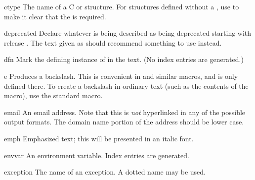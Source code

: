 \documentclass{howto}
\begin{document}
    \begin{macrodesc}{ctype}{}
      The name of a C  or structure.  For structures
      defined without a , use  to make it clear that the  is
      required.
    \end{macrodesc}

    \begin{macrodesc}{deprecated}{}
      Declare whatever is being described as being deprecated starting 
      with release .  The text given as 
      should recommend something to use instead.
    \end{macrodesc}

    \begin{macrodesc}{dfn}{}
      Mark the defining instance of  in the text.  (No index 
      entries are generated.)
    \end{macrodesc}

    \begin{macrodesc}{e}{}
      Produces a backslash.  This is convenient in  and
      similar macros, and is only defined there.  To create a
      backslash in ordinary text (such as the contents of the
       macro), use the standard  macro.
    \end{macrodesc}

    \begin{macrodesc}{email}{}
      An email address.  Note that this is \emph{not} hyperlinked in
      any of the possible output formats.  The domain name portion of
      the address should be lower case.
    \end{macrodesc}

    \begin{macrodesc}{emph}{}
      Emphasized text; this will be presented in an italic font.
    \end{macrodesc}

    \begin{macrodesc}{envvar}{}
      An environment variable.  Index entries are generated.
    \end{macrodesc}

    \begin{macrodesc}{exception}{}
      The name of an exception.  A dotted name may be used.
    \end{macrodesc}
\end{document}
